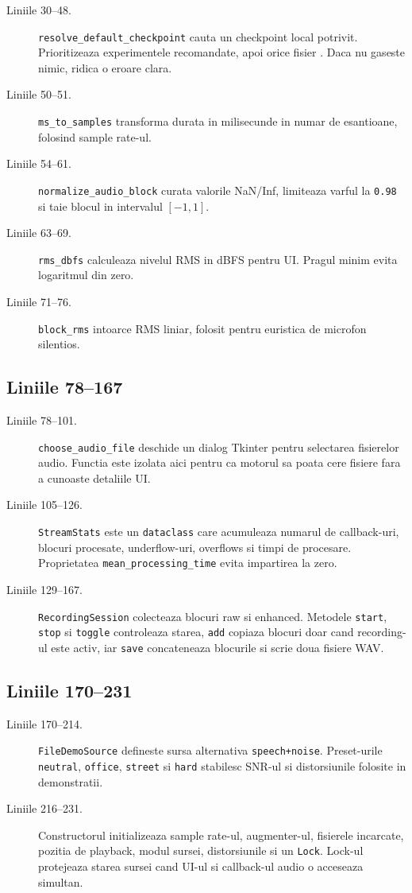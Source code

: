 \documentclass[12pt,a4paper]{report}
\newcommand{\chunk}[3]{\subsection*{Liniile #2--#3}}
\begin{document}
\begin{description}
    \item[Liniile 30--48.] \texttt{resolve\_default\_checkpoint} cauta un checkpoint
    local potrivit. Prioritizeaza experimentele recomandate, apoi orice fisier
    . Daca nu gaseste nimic, ridica o eroare clara.
    \item[Liniile 50--51.] \texttt{ms\_to\_samples} transforma durata in milisecunde
    in numar de esantioane, folosind sample rate-ul.
    \item[Liniile 54--61.] \texttt{normalize\_audio\_block} curata valorile NaN/Inf,
    limiteaza varful la \texttt{0.98} si taie blocul in intervalul \([-1,1]\).
    \item[Liniile 63--69.] \texttt{rms\_dbfs} calculeaza nivelul RMS in dBFS pentru
    UI. Pragul minim evita logaritmul din zero.
    \item[Liniile 71--76.] \texttt{block\_rms} intoarce RMS liniar, folosit pentru
    euristica de microfon silentios.
\end{description}

\chunk{../src/tools/realtime/common.py}{78}{167}

\begin{description}
    \item[Liniile 78--101.] \texttt{choose\_audio\_file} deschide un dialog Tkinter
    pentru selectarea fisierelor audio. Functia este izolata aici pentru ca
    motorul sa poata cere fisiere fara a cunoaste detaliile UI.
    \item[Liniile 105--126.] \texttt{StreamStats} este un \texttt{dataclass} care
    acumuleaza numarul de callback-uri, blocuri procesate, underflow-uri,
    overflows si timpi de procesare. Proprietatea \texttt{mean\_processing\_time}
    evita impartirea la zero.
    \item[Liniile 129--167.] \texttt{RecordingSession} colecteaza blocuri raw si
    enhanced. Metodele \texttt{start}, \texttt{stop} si \texttt{toggle} controleaza
    starea, \texttt{add} copiaza blocuri doar cand recording-ul este activ, iar
    \texttt{save} concateneaza blocurile si scrie doua fisiere WAV.
\end{description}

\chunk{../src/tools/realtime/common.py}{170}{231}

\begin{description}
    \item[Liniile 170--214.] \texttt{FileDemoSource} defineste sursa alternativa
    \texttt{speech+noise}. Preset-urile \texttt{neutral}, \texttt{office},
    \texttt{street} si \texttt{hard} stabilesc SNR-ul si distorsiunile folosite
    in demonstratii.
    \item[Liniile 216--231.] Constructorul initializeaza sample rate-ul,
    augmenter-ul, fisierele incarcate, pozitia de playback, modul sursei,
    distorsiunile si un \texttt{Lock}. Lock-ul protejeaza starea sursei cand UI-ul
    si callback-ul audio o acceseaza simultan.
\end{description}
\end{document}
